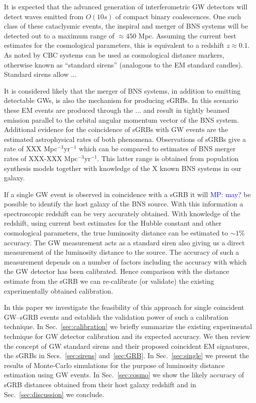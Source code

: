 \documentclass[10pt]{iopart}
\newcommand{\MP}[1]{\textcolor{blue}{MP: #1}}
\begin{document}
It is expected that the advanced generation of interferometric \ac{GW}
detectors will detect waves emitted from $O(10s)$ of compact binary
coalescences.  One such class of these cataclysmic events, the inspiral and
merger of \ac{BNS} systems will be detected out to a maximum range of $\approx
450$ Mpc. Assuming the current best estimates for the cosmological parameters,
this is equivalent to a redshift $z\approx 0.1$. As noted by \cite{1986Natur.323..310S} \ac{CBC}
systems can be used as cosmological distance markers, otherwise known as
``standard sirens'' (analogous to the \ac{EM} standard candles). Standard sirens
allow ...

It is considered likely that the merger of \ac{BNS} systems, in addition to
emitting detectable \acp{GW}, is also the mechanism for producing \acp{sGRB}.
In this scenario these \ac{EM} events are produced through the ... and result
in tightly beamed emission parallel to the orbital angular momentum vector of
the \ac{BNS} system. Additional evidence for the coincidence of \acp{sGRB} with
\ac{GW} events are the estimated astrophysical rates of both phenomena.
Observations of \acp{sGRB} give a rate of XXX Mpc$^{-3}$yr$^{-1}$ which can be
compared to estimates of \ac{BNS} merger rates of XXX-XXX Mpc$^{-3}$yr$^{-1}$.
This latter range is obtained from population synthesis models together with
knowledge of the X known \ac{BNS} systems in our galaxy. 
  
If a single \ac{GW} event is observed in coincidence with a \ac{sGRB} it will \MP{may?}
be possible to identify the host galaxy of the \ac{BNS} source.  With this
information a spectroscopic redshift can be very accurately obtained. With
knowledge of the redshift, using current best estimates for the Hubble constant
and other cosmological parameters, the true luminosity distance can be
estimated to $\sim 1\%$ accuracy.  The \ac{GW} measurement acts as a standard
siren also giving us a direct measurement of the luminosity distance to the source.
The accuracy of such a measurement depends on a number of factors including the
accuracy with which the \ac{GW} detector has been calibrated.  Hence comparison
with the distance estimate from the \ac{sGRB} we can re-calibrate (or validate)
the existing experimentally obtained calibration. 

In this paper we investigate the feasibility of this approach for single
coincident \ac{GW}--\ac{sGRB} events and establish the validation power of such
a calibration technique.  In Sec.~\ref{sec:calibration} we briefly summarize
the existing experimental technique for \ac{GW} detector calibration and its
expected accuracy.  We then review the concept of \ac{GW} standard sirens and
their proposed coincident \ac{EM} signatures, the \acp{sGRB} in
Secs.~\ref{sec:sirens} and~\ref{sec:GRB}. In Sec.~\ref{sec:single} we present
the results of Monte-Carlo simulations for the purpose of luminosity distance
estimation using \ac{GW} events. In Sec.~\ref{sec:cosmo} we show the likely
accuracy of \ac{sGRB} distances obtained from their host galaxy redshift and in
Sec.~\ref{sec:discussion} we conclude.    
\end{document}
